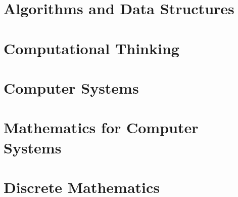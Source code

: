 \documentclass{article}
\begin{document}
\section{Algorithms and Data Structures}


\section{Computational Thinking}

\section{Computer Systems}


\section{Mathematics for Computer Systems}


\section{Discrete Mathematics}

\end{document}
